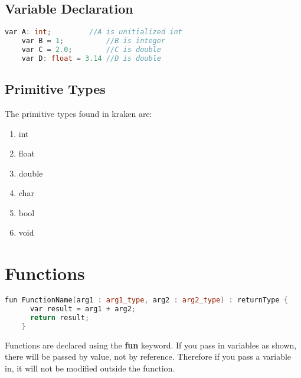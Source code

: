 \documentclass{article}
\begin{document}
\subsection{Variable Declaration}
  \begin{lstlisting}[language=C++]
    var A: int;         //A is unitialized int
    var B = 1;          //B is integer
    var C = 2.0;        //C is double
    var D: float = 3.14 //D is double

  \end{lstlisting}
\subsection{Primitive Types}
  The primitive types found in kraken are:
    \begin{enumerate}
      \item int
      \item float
      \item double
      \item char
      \item bool
      \item void
    \end{enumerate}

\section{Functions}
   \begin{lstlisting}[language=C++]
    fun FunctionName(arg1 : arg1_type, arg2 : arg2_type) : returnType {
      var result = arg1 + arg2;
      return result;
    }
  \end{lstlisting}

    Functions are declared using the {\bf{fun}} keyword.  If you pass in 
  variables as shown, there will be passed by value, not by reference.  
  Therefore if you pass a variable in, it will not be modified outside the
  function.
\end{document}
